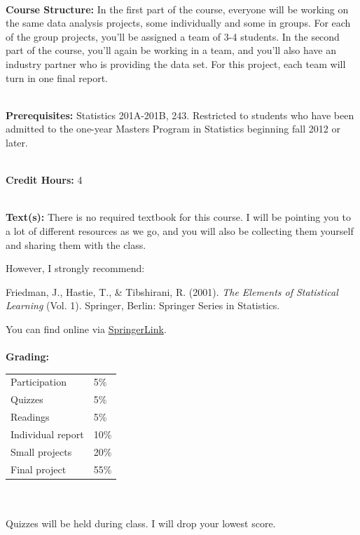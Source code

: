 \documentclass[11pt]{article}
\begin{document}
\textbf {\large \\ Course Structure:}
In the first part of the course, everyone will be working on the same data
analysis projects, some individually and some in groups. For each of the group
projects, you'll be assigned a team of 3-4 students.  In the second part of
the course, you'll again be working in a team, and you'll also have an industry
partner who is providing the data set. For this project, each team will turn in
one final report.

\textbf {\large \\ Prerequisites:}
Statistics 201A-201B, 243. Restricted to students who have been admitted to
the one-year Masters Program in Statistics beginning fall 2012 or later.

\textbf {\large \\ Credit Hours:} 4

\textbf {\large \\ Text(s):} 
There is no required textbook for this course.  I will be pointing you to a lot
of different resources as we go, and you will also be collecting them yourself
and sharing them with the class.

However, I strongly recommend:

\vspace{2mm}

Friedman, J., Hastie, T., \& Tibshirani, R. (2001). \emph{The Elements of Statistical Learning}
(Vol. 1). Springer, Berlin: Springer Series in Statistics.

\vspace{2mm}

You can find online via \href{http://link.springer.com/book/10.1007\%2F978-0-387-21606-5}{SpringerLink}. \\

\textbf {\large \\ Grading:}
\hspace*{40mm}
\begin{tabular}{ l l }
Participation  & 5\% \\
Quizzes  & 5\% \\
Readings & 5\% \\
Individual report  & 10\% \\
Small projects & 20\% \\
Final project  & 55\%
\end{tabular} \\\\

Quizzes will be held during class.  I will drop your lowest score.
\end{document}
